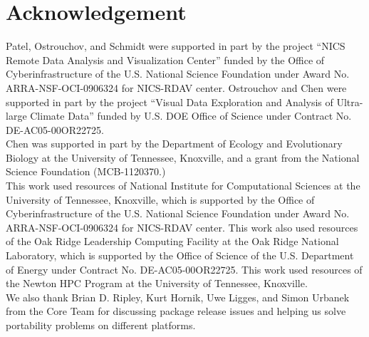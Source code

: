 
\section*{Acknowledgement}

Patel, Ostrouchov, and Schmidt were supported in part by the project
``NICS Remote Data Analysis and Visualization Center''
funded by the Office of Cyberinfrastructure of the
U.S. National Science Foundation
under Award No. ARRA-NSF-OCI-0906324 for NICS-RDAV center.
Ostrouchov and Chen were supported in part by the project
``Visual Data Exploration and Analysis of Ultra-large Climate Data''
funded by U.S. DOE Office of Science
under Contract No. DE-AC05-00OR22725.
\\

Chen was supported in part by
the Department of Ecology and Evolutionary Biology at the
University of Tennessee, Knoxville, and a grant from
the National Science Foundation (MCB-1120370.)
\\

This work used resources of National Institute for Computational
Sciences at the University of Tennessee, Knoxville, which is supported
by the Office of Cyberinfrastructure of the U.S. National Science Foundation
under Award No. ARRA-NSF-OCI-0906324 for NICS-RDAV center.
This work also used resources of the Oak Ridge Leadership Computing Facility at
the Oak Ridge National Laboratory, which is supported by the Office of Science
of the U.S. Department of Energy under Contract No. DE-AC05-00OR22725.
This work used resources of the Newton HPC Program at the University of
Tennessee, Knoxville.
\\

We also thank Brian D. Ripley, Kurt Hornik, Uwe Ligges, and Simon Urbanek
from the  Core Team for discussing package release issues and
helping us solve portability problems on different platforms.
\\

